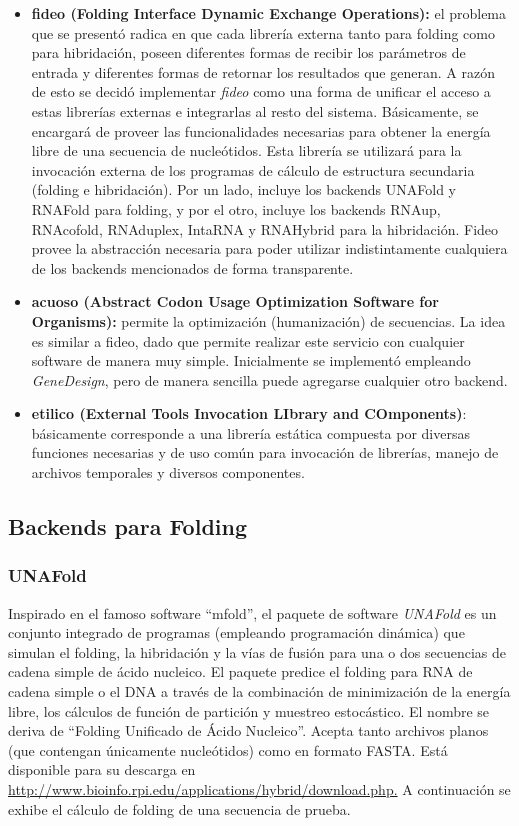 \begin{itemize}
	\item \textbf{fideo (Folding Interface Dynamic Exchange Operations): } el problema que se presentó radica en que cada librería externa tanto para folding como para hibridación, poseen diferentes formas de recibir los parámetros de entrada y diferentes formas de retornar los resultados que generan. A razón de esto se decidó implementar \emph{fideo} como una forma de unificar el acceso a estas librerías externas e integrarlas al resto del sistema. Básicamente, se encargará de proveer las funcionalidades necesarias para obtener la energía libre de una secuencia de nucleótidos. Esta librería se utilizará para la invocación externa de los programas de cálculo de estructura secundaria (folding e hibridación). Por un lado, incluye los backends UNAFold y RNAFold para folding, y por el otro, incluye los backends RNAup, RNAcofold, RNAduplex, IntaRNA y RNAHybrid para la hibridación. Fideo provee la abstracción necesaria para poder utilizar indistintamente cualquiera de los backends mencionados de forma transparente.

	\item \textbf{acuoso (Abstract Codon Usage Optimization Software for Organisms): } permite la optimización (humanización) de secuencias. La idea es similar a fideo, dado que permite realizar este servicio con cualquier software de manera muy simple. Inicialmente se implementó empleando \emph{GeneDesign}, pero de manera sencilla puede agregarse cualquier otro backend.

	\item \textbf{etilico (External Tools Invocation LIbrary and COmponents)}: básicamente corresponde a una librería estática compuesta por diversas funciones necesarias y de uso común para invocación de librerías, manejo de archivos temporales y diversos componentes.
\end{itemize}

\subsection{Backends para Folding}

\subsubsection{UNAFold}
\label{unafold}
\par Inspirado en el famoso software ``mfold'', el paquete de software \emph{UNAFold}\cite{unafold} es un conjunto integrado de programas (empleando programación dinámica\cite{ProgDinaminca}) que simulan el folding, la hibridación y la vías de fusión para una o dos secuencias de cadena simple de ácido nucleico. El paquete predice el folding para RNA de cadena simple o el DNA a través de la combinación de minimización de la energía libre, los cálculos de función de partición y muestreo estocástico. El nombre se deriva de ``Folding Unificado de Ácido Nucleico''. Acepta tanto archivos planos (que contengan únicamente nucleótidos) como en formato FASTA. Está disponible para su descarga en \url{http://www.bioinfo.rpi.edu/applications/hybrid/download.php.}
A continuación se exhibe el cálculo de folding de una secuencia de prueba.

